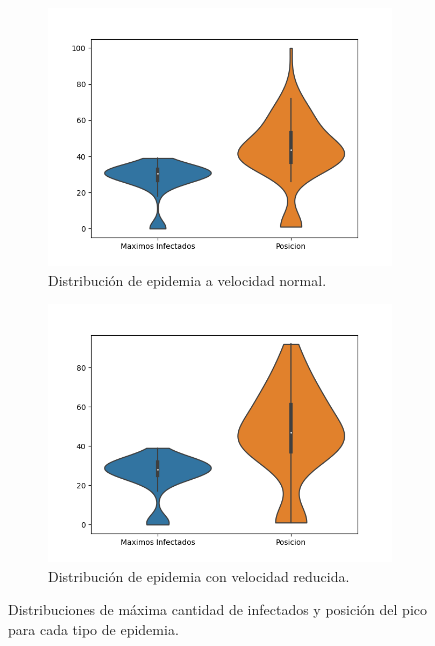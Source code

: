 \documentclass{article}
\begin{document}
\begin{figure}[h]
     \begin{subfigure}[b]{0.49\textwidth}
         \centering
         \includegraphics[width=\textwidth]{Fast_Epidemic.png}
         \caption{Distribuci\'on de epidemia a velocidad normal.}
         \label{fast}
     \end{subfigure}
     \begin{subfigure}[b]{0.49\textwidth}
         \centering
         \includegraphics[width=\textwidth]{Slow_Epidemic.png}
         \caption{Distribuci\'on de epidemia con velocidad reducida.}
         \label{slow}
     \end{subfigure}
     \caption{Distribuciones de m\'axima cantidad de infectados y posici\'on del pico para cada tipo de epidemia.}
     \label{epidemias}
\end{figure}
\end{document}
